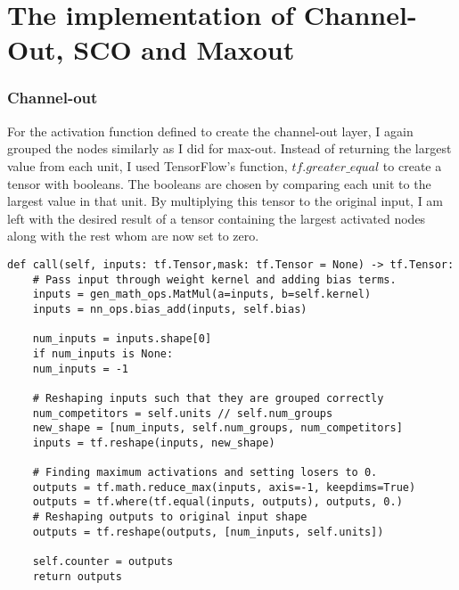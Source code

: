 \section{The implementation of Channel-Out, \ac{SCO} and Maxout}

\subsubsection*{Channel-out}
For the activation function defined to create the channel-out layer, I again grouped
the nodes similarly as I did for max-out. Instead of returning the largest value from each 
unit, I used TensorFlow's function, $tf.greater\_equal$ to create a tensor with booleans. The 
booleans are chosen by comparing each unit to the largest value in that unit. By multiplying 
this tensor to the original input, I am left with the desired result of a tensor containing 
the largest activated nodes along with the rest whom are now set to zero. 
\lstset{style=Python}
\begin{lstlisting}[caption={Python implementation for the custom activation function used to define the channel-out layer.},captionpos=b, label={lst:channel_out}]
def call(self, inputs: tf.Tensor,mask: tf.Tensor = None) -> tf.Tensor:
    # Pass input through weight kernel and adding bias terms.
    inputs = gen_math_ops.MatMul(a=inputs, b=self.kernel)
    inputs = nn_ops.bias_add(inputs, self.bias)

    num_inputs = inputs.shape[0]
    if num_inputs is None:
    num_inputs = -1

    # Reshaping inputs such that they are grouped correctly
    num_competitors = self.units // self.num_groups
    new_shape = [num_inputs, self.num_groups, num_competitors]
    inputs = tf.reshape(inputs, new_shape)

    # Finding maximum activations and setting losers to 0.
    outputs = tf.math.reduce_max(inputs, axis=-1, keepdims=True)
    outputs = tf.where(tf.equal(inputs, outputs), outputs, 0.)
    # Reshaping outputs to original input shape
    outputs = tf.reshape(outputs, [num_inputs, self.units])

    self.counter = outputs
    return outputs 
\end{lstlisting}

